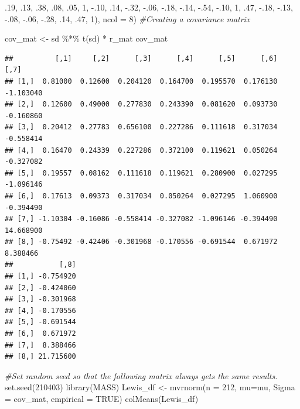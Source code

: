 \documentclass[
  english,
]{book}
\newenvironment{Shaded}{\begin{snugshade}}{\end{snugshade}}
\newcommand{\AttributeTok}[1]{\textcolor[rgb]{0.77,0.63,0.00}{#1}}
\newcommand{\CommentTok}[1]{\textcolor[rgb]{0.56,0.35,0.01}{\textit{#1}}}
\newcommand{\ConstantTok}[1]{\textcolor[rgb]{0.00,0.00,0.00}{#1}}
\newcommand{\DecValTok}[1]{\textcolor[rgb]{0.00,0.00,0.81}{#1}}
\newcommand{\FunctionTok}[1]{\textcolor[rgb]{0.00,0.00,0.00}{#1}}
\newcommand{\NormalTok}[1]{#1}
\newcommand{\OtherTok}[1]{\textcolor[rgb]{0.56,0.35,0.01}{#1}}
\newcommand{\SpecialCharTok}[1]{\textcolor[rgb]{0.00,0.00,0.00}{#1}}
\begin{document}
\begin{Shaded}
\begin{Highlighting}[]
\NormalTok{        .}\DecValTok{19}\NormalTok{, .}\DecValTok{13}\NormalTok{, .}\DecValTok{38}\NormalTok{, .}\DecValTok{08}\NormalTok{, .}\DecValTok{05}\NormalTok{, }\DecValTok{1}\NormalTok{, }\SpecialCharTok{{-}}\NormalTok{.}\DecValTok{10}\NormalTok{, .}\DecValTok{14}\NormalTok{, }
        \SpecialCharTok{{-}}\NormalTok{.}\DecValTok{32}\NormalTok{, }\SpecialCharTok{{-}}\NormalTok{.}\DecValTok{06}\NormalTok{, }\SpecialCharTok{{-}}\NormalTok{.}\DecValTok{18}\NormalTok{, }\SpecialCharTok{{-}}\NormalTok{.}\DecValTok{14}\NormalTok{, }\SpecialCharTok{{-}}\NormalTok{.}\DecValTok{54}\NormalTok{, }\SpecialCharTok{{-}}\NormalTok{.}\DecValTok{10}\NormalTok{, }\DecValTok{1}\NormalTok{, .}\DecValTok{47}\NormalTok{,}
        \SpecialCharTok{{-}}\NormalTok{.}\DecValTok{18}\NormalTok{, }\SpecialCharTok{{-}}\NormalTok{.}\DecValTok{13}\NormalTok{, }\SpecialCharTok{{-}}\NormalTok{.}\DecValTok{08}\NormalTok{, }\SpecialCharTok{{-}}\NormalTok{.}\DecValTok{06}\NormalTok{, }\SpecialCharTok{{-}}\NormalTok{.}\DecValTok{28}\NormalTok{, .}\DecValTok{14}\NormalTok{, .}\DecValTok{47}\NormalTok{, }\DecValTok{1}\NormalTok{), }\AttributeTok{ncol =} \DecValTok{8}\NormalTok{)}
\CommentTok{\#Creating a covariance matrix}

\NormalTok{cov\_mat }\OtherTok{\textless{}{-}}\NormalTok{ sd }\SpecialCharTok{\%*\%} \FunctionTok{t}\NormalTok{(sd) }\SpecialCharTok{*}\NormalTok{ r\_mat}
\NormalTok{cov\_mat}
\end{Highlighting}
\end{Shaded}

\begin{verbatim}
##          [,1]     [,2]      [,3]      [,4]      [,5]      [,6]      [,7]
## [1,]  0.81000  0.12600  0.204120  0.164700  0.195570  0.176130 -1.103040
## [2,]  0.12600  0.49000  0.277830  0.243390  0.081620  0.093730 -0.160860
## [3,]  0.20412  0.27783  0.656100  0.227286  0.111618  0.317034 -0.558414
## [4,]  0.16470  0.24339  0.227286  0.372100  0.119621  0.050264 -0.327082
## [5,]  0.19557  0.08162  0.111618  0.119621  0.280900  0.027295 -1.096146
## [6,]  0.17613  0.09373  0.317034  0.050264  0.027295  1.060900 -0.394490
## [7,] -1.10304 -0.16086 -0.558414 -0.327082 -1.096146 -0.394490 14.668900
## [8,] -0.75492 -0.42406 -0.301968 -0.170556 -0.691544  0.671972  8.388466
##           [,8]
## [1,] -0.754920
## [2,] -0.424060
## [3,] -0.301968
## [4,] -0.170556
## [5,] -0.691544
## [6,]  0.671972
## [7,]  8.388466
## [8,] 21.715600
\end{verbatim}

\begin{Shaded}
\begin{Highlighting}[]
\CommentTok{\#Set random seed so that the following matrix always gets the same results.}
\FunctionTok{set.seed}\NormalTok{(}\DecValTok{210403}\NormalTok{)}
\FunctionTok{library}\NormalTok{(MASS)}
\NormalTok{Lewis\_df }\OtherTok{\textless{}{-}} \FunctionTok{mvrnorm}\NormalTok{(}\AttributeTok{n =} \DecValTok{212}\NormalTok{, }\AttributeTok{mu=}\NormalTok{mu, }\AttributeTok{Sigma =}\NormalTok{ cov\_mat, }\AttributeTok{empirical =} \ConstantTok{TRUE}\NormalTok{)}
\FunctionTok{colMeans}\NormalTok{(Lewis\_df)}
\end{Highlighting}
\end{Shaded}
\end{document}
